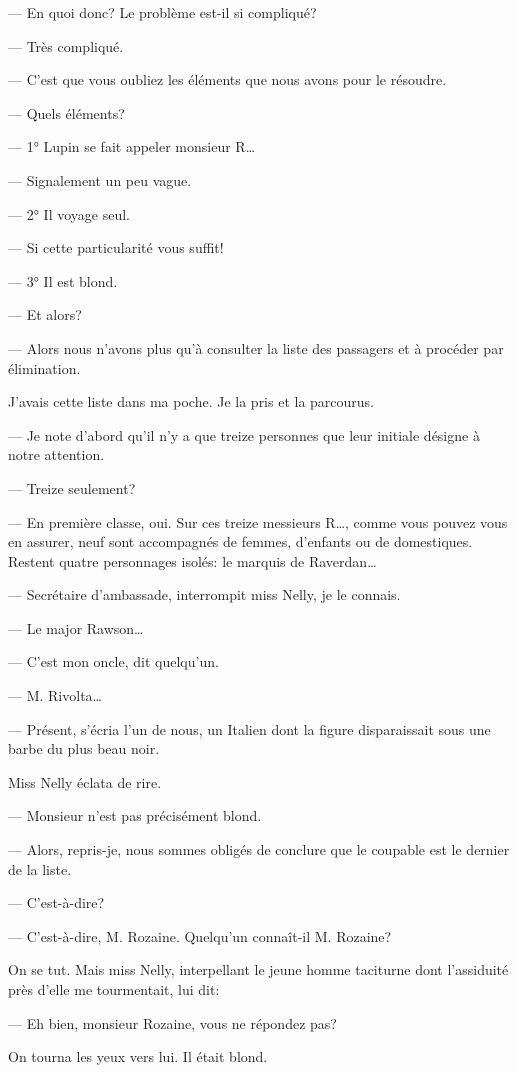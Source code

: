 \documentclass[12pt,a4paper]{book}
\begin{document}
— En quoi donc? Le problème est-il si compliqué?

— Très compliqué.

— C’est que vous oubliez les éléments que nous avons pour le résoudre.

— Quels éléments?

— 1° Lupin se fait appeler monsieur R…

— Signalement un peu vague.

— 2° Il voyage seul.

— Si cette particularité vous suffit!

— 3° Il est blond.

— Et alors?

— Alors nous n’avons plus qu’à consulter la liste des passagers et à procéder par élimination.

J’avais cette liste dans ma poche. Je la pris et la parcourus. 

— Je note d’abord qu’il n’y a que treize personnes que leur initiale désigne à notre attention.

— Treize seulement?

— En première classe, oui. Sur ces treize messieurs R…, comme vous pouvez vous en assurer, neuf sont accompagnés de femmes, d’enfants ou de domestiques. Restent quatre personnages isolés: le marquis de Raverdan…

— Secrétaire d’ambassade, interrompit miss Nelly, je le connais.

— Le major Rawson…

— C’est mon oncle, dit quelqu’un.

— M. Rivolta…

— Présent, s’écria l’un de nous, un Italien dont la figure disparaissait sous une barbe du plus beau noir.

Miss Nelly éclata de rire.

— Monsieur n’est pas précisément blond.

— Alors, repris-je, nous sommes obligés de conclure que le coupable est le dernier de la liste.

— C’est-à-dire?

— C’est-à-dire, M. Rozaine. Quelqu’un connaît-il M. Rozaine?

On se tut. Mais miss Nelly, interpellant le jeune homme taciturne dont l’assiduité près d’elle me tourmentait, lui dit:

— Eh bien, monsieur Rozaine, vous ne répondez pas? 

On tourna les yeux vers lui. Il était blond.
\end{document}
